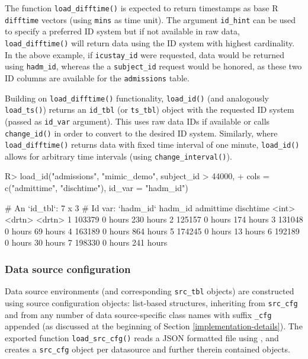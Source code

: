 \documentclass[
]{jss}
\begin{document}
The function \texttt{load\_difftime()} is expected to return timestamps
as base R \texttt{difftime} vectors (using \texttt{mins} as time unit).
The argument \texttt{id\_hint} can be used to specify a preferred ID
system but if not available in raw data, \texttt{load\_difftime()} will
return data using the ID system with highest cardinality. In the above
example, if \texttt{icustay\_id} were requested, data would be returned
using \texttt{hadm\_id}, whereas the a \texttt{subject\_id} request
would be honored, as these two ID columns are available for the
\texttt{admissions} table.

Building on \texttt{load\_difftime()} functionality, \texttt{load\_id()}
(and analogously \texttt{load\_ts()}) returns an \texttt{id\_tbl} (or
\texttt{ts\_tbl}) object with the requested ID system (passed as
\texttt{id\_var} argument). This uses raw data IDs if available or calls
\texttt{change\_id()} in order to convert to the desired ID system.
Similarly, where \texttt{load\_difftime()} returns data with fixed time
interval of one minute, \texttt{load\_id()} allows for arbitrary time
intervals (using \texttt{change\_interval()}).

\begin{CodeChunk}
\begin{CodeInput}
R> load_id("admissions", "mimic_demo", subject_id > 44000,
+         cols = c("admittime", "dischtime"), id_var = "hadm_id")
\end{CodeInput}
\end{CodeChunk}

\begin{CodeChunk}
\begin{CodeOutput}
# An `id_tbl`: 7 x 3
# Id var:      `hadm_id`
  hadm_id admittime dischtime
    <int> <drtn>    <drtn>
1  103379 0 hours   230 hours
2  125157 0 hours   174 hours
3  131048 0 hours    69 hours
4  163189 0 hours   864 hours
5  174245 0 hours    13 hours
6  192189 0 hours    30 hours
7  198330 0 hours   241 hours
\end{CodeOutput}
\end{CodeChunk}

\hypertarget{data-source-configuration}{%
\subsubsection{Data source
configuration}\label{data-source-configuration}}

Data source environments (and corresponding \texttt{src\_tbl} objects)
are constructed using source configuration objects: list-based
structures, inheriting from \texttt{src\_cfg} and from any number of
data source-specific class names with suffix \texttt{\_cfg} appended (as
discussed at the beginning of Section \ref{implementation-details}). The
exported function \texttt{load\_src\_cfg()} reads a JSON formatted file
using  \citep{ooms2014}, and creates a \texttt{src\_cfg}
object per datasource and further therein contained objects.
\end{document}
